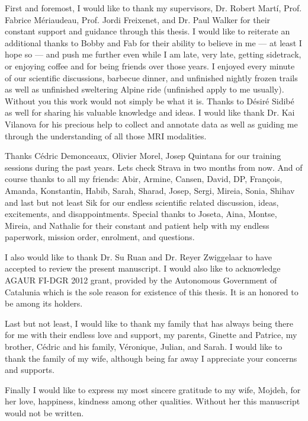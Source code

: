 

\begin{acknowledgements}      %
First and foremost, I would like to thank my supervisors, Dr. Robert Mart\'i, Prof. Fabrice M\'eriaudeau, Prof. Jordi Freixenet, and Dr. Paul Walker for their constant support and guidance through this thesis.
I would like to reiterate an additional thanks to Bobby and Fab for their ability to believe in me --- at least I hope so --- and push me further even while I am late, very late, getting sidetrack, or enjoying coffee and for being friends over those years.
I enjoyed every minute of our scientific discussions, barbecue dinner, and unfinished nightly frozen trails as well as unfinished sweltering Alpine ride (unfinished apply to me usually).
Without you this work would not simply be what it is. 
Thanks to D\'esir\'e Sidib\'e as well for sharing his valuable knowledge and ideas.
I would like thank Dr. Kai Vilanova for his precious help to collect and annotate data as well as guiding me through the understanding of all those MRI modalities.

Thanks C\'edric Demonceaux, Olivier Morel, Josep Quintana for our training sessions during the past years.
Lets check Strava in two months from now.
And of course thanks to all my friends: Abir, Armine, Cansen, David, DP, Fran\c{c}ois, Amanda, Konstantin, Habib, Sarah, Sharad, Josep, Sergi, Mireia, Sonia, Shihav and last but not least Sik for our endless scientific related discussion, ideas, excitements, and disappointments.
Special thanks to Joseta, Aina, Montse, Mireia, and Nathalie for their constant and patient help with my endless paperwork, mission order, enrolment, and questions.

I also would like to thank Dr. Su Ruan and Dr. Reyer Zwiggelaar to have accepted to review the present manuscript.
I would also like to acknowledge AGAUR FI-DGR 2012 grant, provided by the Autonomous Government of Catalunia which is the sole reason for existence of this thesis.
It is an honored to be among its holders.


Last but not least, I would like to thank my family that has always being there for me with their endless love and support, my parents, Ginette and Patrice, my brother, C\'edric and his family, V\'eronique, Julian, and Sarah.
I would like to thank the family of my wife, although being far away I appreciate your concerns and supports. 

Finally I would like to express my most sincere gratitude to my wife, Mojdeh, for her love, happiness, kindness among other qualities.
Without her this manuscript would not be written.
   

\end{acknowledgements}




